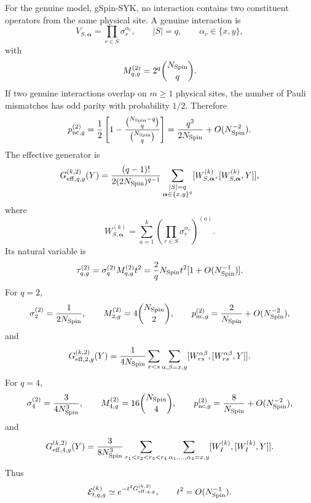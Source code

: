 \documentclass{article}
\theoremstyle{definition}
\begin{document}
For the genuine model, gSpin-SYK, no interaction contains two constituent
operators from the same physical site.  A genuine interaction is
\begin{equation}
    V_{S,\boldsymbol\alpha}
    =\prod_{r\in S}\sigma_r^{\alpha_r},
    \qquad
    |S|=q,
    \qquad
    \alpha_r\in\{x,y\},
\end{equation}
with
\begin{equation}
    M_{q,g}^{(2)}=2^q\binom{N_{\rm Spin}}q.
\end{equation}
If two genuine interactions overlap on $m\ge1$ physical sites, the number
of Pauli mismatches has odd parity with probability $1/2$.  Therefore
\begin{equation}
    p_{{\rm nc},g}^{(2)}
    =\frac12\left[
       1-\frac{\binom{N_{\rm Spin}-q}{q}}
               {\binom{N_{\rm Spin}}q}
    \right]
    =\frac{q^2}{2N_{\rm Spin}}+O(N_{\rm Spin}^{-2}).
\end{equation}
The effective generator is
\begin{equation}
    G_{{\rm eff},q,g}^{(k,2)}(Y)
    =\frac{(q-1)!}{2(2N_{\rm Spin})^{q-1}}
    \sum_{\substack{|S|=q\\
                    \boldsymbol\alpha\in\{x,y\}^q}}
    [W_{S,\boldsymbol\alpha}^{(k)},
     [W_{S,\boldsymbol\alpha}^{(k)},Y]],
\end{equation}
where
\begin{equation}
    W_{S,\boldsymbol\alpha}^{(k)}
    =\sum_{a=1}^k
    \left(\prod_{r\in S}\sigma_r^{\alpha_r}\right)^{(a)}.
\end{equation}
Its natural variable is
\begin{equation}
    \tau_{q,g}^{(2)}
    =\sigma_q^{(2)}M_{q,g}^{(2)}t^2
    =\frac{2}{q}N_{\rm Spin}t^2
      [1+O(N_{\rm Spin}^{-1})].
\end{equation}
For $q=2$,
\begin{equation}
    \sigma_2^{(2)}=\frac{1}{2N_{\rm Spin}},
    \qquad
    M_{2,g}^{(2)}=4\binom{N_{\rm Spin}}2,
    \qquad
    p_{{\rm nc},g}^{(2)}
    =\frac{2}{N_{\rm Spin}}+O(N_{\rm Spin}^{-2}),
\end{equation}
and
\begin{equation}
    G_{{\rm eff},2,g}^{(k,2)}(Y)
    =\frac{1}{4N_{\rm Spin}}
    \sum_{r<s}\sum_{\alpha,\beta=x,y}
    [W_{rs}^{\alpha\beta},[W_{rs}^{\alpha\beta},Y]].
\end{equation}
For $q=4$,
\begin{equation}
    \sigma_4^{(2)}=\frac{3}{4N_{\rm Spin}^3},
    \qquad
    M_{4,g}^{(2)}=16\binom{N_{\rm Spin}}4,
    \qquad
    p_{{\rm nc},g}^{(2)}
    =\frac{8}{N_{\rm Spin}}+O(N_{\rm Spin}^{-2}),
\end{equation}
and
\begin{equation}
    G_{{\rm eff},4,g}^{(k,2)}(Y)
    =\frac{3}{8N_{\rm Spin}^3}
    \sum_{r_1<r_2<r_3<r_4}
    \sum_{\alpha_1,\ldots,\alpha_4=x,y}
    [W_I^{(k)},[W_I^{(k)},Y]].
\end{equation}
Thus
\begin{equation}
    {\cal E}_{t,q,g}^{(k)}
    \simeq e^{-t^2G_{{\rm eff},q,g}^{(k,2)}},
    \qquad t^2=O(N_{\rm Spin}^{-1}).
\end{equation}
\end{document}
